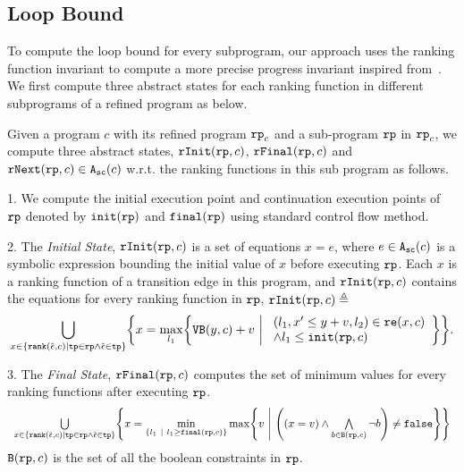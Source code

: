 \subsection{Loop Bound}
To compute the loop bound for every subprogram, our approach uses the ranking function invariant to compute a more precise progress invariant inspired from~\cite{GulwaniJK09}.
We first compute three abstract states for each ranking function in different subprograms of a refined program as below.
\begin{defn}
 \label{def:alg-absstate}
 Given a program $c$ with its refined program $\mathtt{rp}_c$ and a sub-program $\mathtt{rp}$ in $\mathtt{rp}_c$,
 we compute three abstract states, $\mathtt{rInit}(\mathtt{rp}, c)$, $\mathtt{rFinal}(\mathtt{rp}, c)$ and $\mathtt{rNext}(\mathtt{rp}, c) \in {\ensuremath{\mathtt{A_{sc}}}}(c)$ w.r.t. the ranking functions in this sub program as follows.
 
 1. We compute the initial execution point and continuation execution points of $\mathtt{rp}$ denoted by
 $\mathtt{init}(\mathtt{rp})$
 and 
 $\mathtt{final}(\mathtt{rp})$ using standard control flow method.
 
2. The \emph{Initial State}, 
 $\mathtt{rInit}(\mathtt{rp}, c)$ is a set of equations $x = e$, where $e \in {\ensuremath{\mathtt{A_{sc}}}}(c)$ is a
 symbolic expression bounding the initial value of $x$ before executing $\mathtt{rp}$.
 Each $x$ is a ranking function of a transition edge in this program, and $\mathtt{rInit}(\mathtt{rp}, c)$ contains the equations for every ranking function in $\mathtt{rp}$,
 $\mathtt{rInit}(\mathtt{rp}, c) \triangleq $
 {\small
 \[
 \bigcup_{x \in \left\{ \rank(\absevent, c) | \tpath \in \rprog \land \absevent \in \tpath \right\} }
 \left \{ 
 x = \max_{l_1}\left\{
 \varinvar(y, c) + v ~\middle\vert~ 
 \begin{array}{l} 
 (l_1, x' \leq y + v, l_2) \in \reset(x, c) 
 \\
 \land l_1 \leq \absinit(\rprog, c)
 \end{array}
 \right\}
 \right\}.
 \]
 }

 3. The \emph{Final State}, $\mathtt{rFinal}(\mathtt{rp}, c)$ computes the set of minimum values for every ranking functions
 after executing $\mathtt{rp}$.
 {\small
\[
 \begin{array}{l} 
 \bigcup\limits_{x \in \left\{ \rank(\absevent, c) | \tpath \in \rprog \land \absevent \in \tpath \right\} }
 \left \{ 
 x = \min\limits_{ \left\{ l_1 ~|~ l_1 \geq \absfinal(\rprog, c) \right\} }
 \max\left\{
 v ~\middle\vert~ 
 \left( (x = v) \land \bigwedge\limits_{b \in \kw{B}(\rprog, c)} \neg b \right) \neq \efalse
 \right\}
 \right\}
 \end{array}
 \]
 }
 $\mathtt{B}(\mathtt{rp}, c)$ is the set of all the boolean constraints in $\mathtt{rp}$.


\end{defn}
